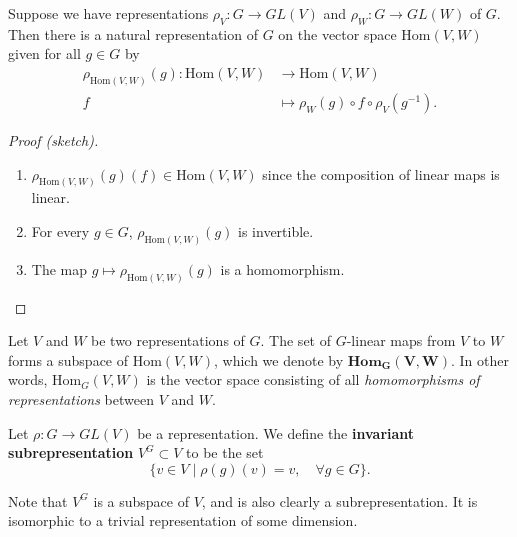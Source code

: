 \begin{frame}
\begin{proposition}
Suppose we have representations $\rho_V \colon G \to GL(V)$ and $\rho_W \colon G \to GL(W)$ of $G$. Then there is a natural representation of $G$ on the vector space $\text{Hom}(V,W)$ given for all $g \in G$ by
\begin{align*}		
 \rho_{\text{Hom}(V,W)}(g)  \colon \text{Hom}(V,W) &\to \text{Hom}(V,W) \\		
 f &\mapsto \rho_{W}(g) \circ f \circ \rho_{V}(g^{-1}).
 \end{align*}		
\end{proposition}		
\begin{proof}[Proof (sketch)]
\begin{enumerate}			
\item $\rho_{\text{Hom}(V,W)}(g)(f) \in \text{Hom}(V,W)$ since the composition of linear maps is linear.
\item For every $g \in G$,  $\rho_{\text{Hom}(V,W)}(g)$ is invertible.	
\item The map $g \mapsto  \rho_{\text{Hom}(V,W)}(g)$ is a homomorphism.	
\end{enumerate}		
\end{proof}
\end{frame}

\begin{frame}
\begin{definition}		
Let $V$ and $W$ be two representations of $G$.  The set of $G$-linear maps from $V$ to $W$ forms a subspace of $\text{Hom}(V,W)$, which we denote by $\textbf{Hom}_\mathbf{G}\mathbf{(V,W)}$.  In other words, $\text{Hom}_{G}(V,W)$ is the vector space consisting of all \textit{homomorphisms of representations} between $V$ and $W$. 
\end{definition} 

\begin{definition}
Let $\rho \colon G \to GL(V)$ be a representation.  We define the \textbf{invariant subrepresentation} $V^G \subset V$ to be the set 
\[ \{ v \in V  \mid \rho(g)(v) = v,  \quad \forall g \in G \}. \]
\end{definition}
\end{frame}
\begin{note}
Note that $V^G$ is a subspace of $V$, and is also clearly a subrepresentation.   It is isomorphic to a trivial representation of some dimension.
\end{note}


